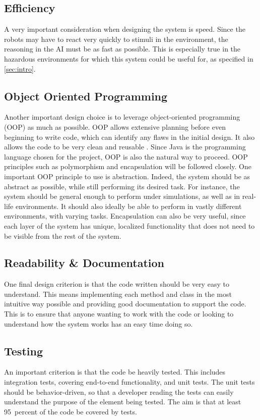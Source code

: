 \documentclass[titlepage,11pt]{article}
\begin{document}
\subsection{Efficiency}
A very important consideration when designing the system is speed. Since the robots may have to react very quickly to stimuli in the environment, the reasoning in the AI must be as fast as possible. This is especially true in the hazardous environments for which this system could be useful for, as specified in \autoref{sec:intro}.

\subsection{Object Oriented Programming}
Another important design choice is to leverage object-oriented programming (OOP) as much as possible. OOP allows extensive planning before even beginning to write code, which can identify any flaws in the initial design. It also allows the code to be very clean and reusable \cite{oop}. Since Java is the programming language chosen for the project, OOP is also the natural way to proceed.  OOP principles such as polymorphism and encapsulation will be followed closely. One important OOP principle to use is abstraction. Indeed, the system should be as abstract as possible, while still performing its desired task. For instance, the system should be general enough to perform under simulations, as well as in real-life environments. It should also ideally be able to perform in vastly different environments, with varying tasks. Encapsulation can also be very useful, since each layer of the system has unique, localized functionality that does not need to be visible from the rest of the system.

\subsection{Readability \& Documentation}
One final design criterion is that the code written should be very easy to understand. This means implementing each method and class in the most intuitive way possible and providing good documentation to support the code. This is to ensure that anyone wanting to work with the code or looking to understand how the system works has an easy time doing so.

\subsection{Testing}
An important criterion is that the code be heavily tested. This includes integration tests, covering end-to-end functionality, and unit tests. The unit tests should be behavior-driven, so that a developer reading the tests can easily understand the purpose of the element being tested. The aim is that at least \SI{95}{percent} of the code be covered by tests.
\end{document}
